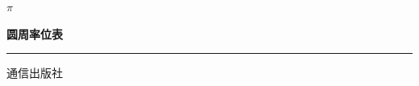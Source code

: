 \documentclass[UTF8,a4paper,12pt,oneside]{ctexbook}
\newcommand{\pibooktitle}{圆周率\totaldigits 位表}
\begin{document}
\begin{titlepage}
\centering
\null\vspace{3cm}

{\fontsize{150pt}{180pt}\selectfont $\pi$}

\vspace{2cm}

{\fontsize{32pt}{38pt}\selectfont\bfseries \pibooktitle\par}


{\Large\rule{12cm}{0.5pt}\par}

\vspace{0.5cm}

{\LARGE 通信出版社\par}

\end{titlepage}

\frontmatter
\tableofcontents

\mainmatter



\backmatter

\end{document}
